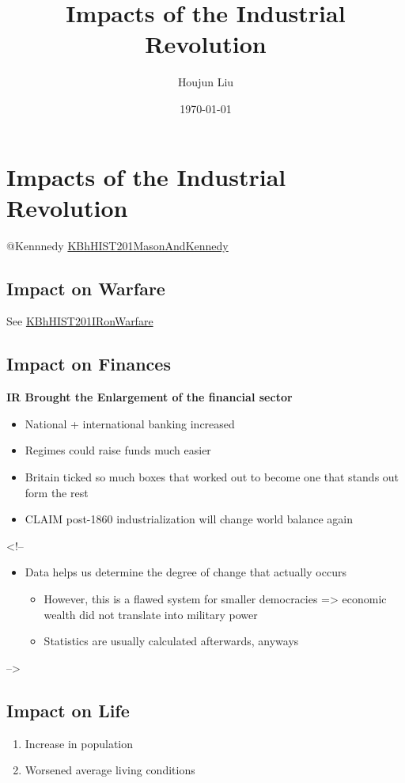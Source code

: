 \documentclass[letterpaper]{article}
\author{Houjun Liu}
\date{\today}
\title{Impacts of the Industrial Revolution}
\renewcommand{\tableofcontents}{}
\begin{document}
\tableofcontents



\section{Impacts of the Industrial Revolution}
\label{sec:orgb2682c3}
@Kennnedy
\href{KBhHIST201MasonAndKennedy.org}{KBhHIST201MasonAndKennedy}

\subsection{Impact on Warfare}
\label{sec:org67a32cb}
See \href{KBhHIST201IRonWarfare.org}{KBhHIST201IRonWarfare}

\subsection{Impact on Finances}
\label{sec:org541c1b2}
\textbf{IR Brought the Enlargement of the financial sector}

\begin{itemize}
\item National + international banking increased

\item Regimes could raise funds much easier

\item Britain ticked so much boxes that worked out to become one that stands
out form the rest

\item CLAIM post-1860 industrialization will change world balance again
\end{itemize}

\begin{html}
<!--
\begin{itemize}
\item Data helps us determine the degree of change that actually occurs
\begin{itemize}
\item However, this is a flawed system for smaller democracies => economic wealth did not translate into military power
\item Statistics are usually calculated afterwards, anyways
\end{itemize}
\end{itemize}
-->
\end{html}

\subsection{Impact on Life}
\label{sec:org4ab7832}
\begin{enumerate}
\item Increase in population
\item Worsened average living conditions
\end{enumerate}
\end{document}

